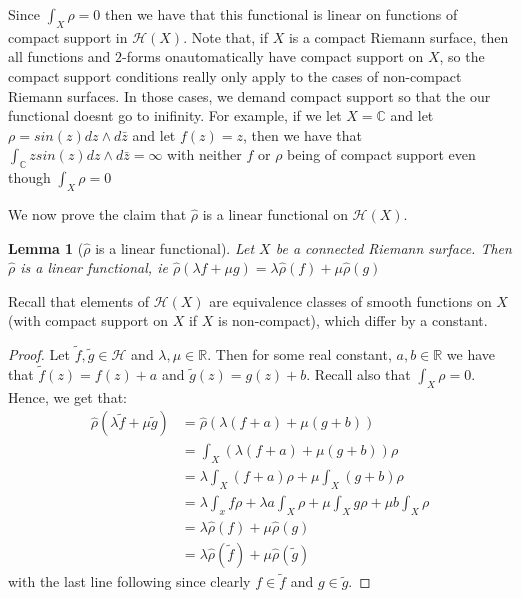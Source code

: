 \documentclass[a4paper,12pt]{report}
\theoremstyle{plain}
\newtheorem{lemma}[thm]{Lemma}
\theoremstyle{definition}
\begin{document}
Since $\int_X \rho = 0$ then we have that this functional is linear on functions of compact support in $\mathcal{H}(X)$. Note that, if $X$ is a compact Riemann surface, then all functions and $2$-forms  onautomatically have compact support on $X$, so the compact support conditions really only apply to the cases of non-compact Riemann surfaces. In those cases, we demand compact support so that the our functional doesnt go to inifinity. For example, if we let $X=\mathbb{C}$ and let $\rho = sin(z)dz\wedge d\bar{z}$ and let $f(z) = z$, then we have that $\int_{\mathbb{C}}zsin(z)dz\wedge d\bar{z} = \infty$ with neither $f$ or $\rho$ being of compact support even though $\int_X \rho = 0$

We now prove the claim that $\hat{\rho}$ is a linear functional on $\mathcal{H}(X)$.
\begin{lemma}[$\hat{\rho}$ is a linear functional]\label{rhohatlinear}
  Let $X$ be a connected Riemann surface. Then $\hat{\rho}$ is a linear functional, ie $\hat{\rho}(\lambda f+ \mu g) = \lambda \hat{\rho}(f) + \mu \hat{\rho}(g)$
\end{lemma}
Recall that elements of $\mathcal{H}(X)$ are equivalence classes of smooth functions on $X$ (with compact support on $X$ if $X$ is non-compact), which differ by a constant.
\begin{proof}
  Let $\tilde{f},\tilde{g} \in \mathcal{H}$ and $\lambda,\mu \in \mathbb{R}$. Then for some real constant, $a,b \in \mathbb{R}$ we have that $\tilde{f}(z) = f(z) + a$ and $\tilde{g}(z) = g(z) + b$. Recall also that $\int_X \rho = 0$.
  Hence, we get that:
  \begin{align*}
    \hat{\rho}(\lambda \tilde{f}+ \mu \tilde{g}) &= \hat{\rho}(\lambda(f + a) + \mu(g + b)) \\
    &=\int_X (\lambda(f + a) + \mu(g + b))\rho \\
    &=\lambda \int_X (f + a)\rho + \mu \int_X (g + b)\rho \\
    &=\lambda \int_x f\rho + \lambda a\int_X \rho + \mu \int_X g\rho + \mu b\int_X \rho \\
    &=\lambda \hat{\rho}(f) + \mu \hat{\rho}(g)\\
    &=\lambda \hat{\rho}(\tilde{f}) + \mu \hat{\rho}(\tilde{g})
  \end{align*}
  with the last line following since clearly $f \in \tilde{f}$ and $g \in \tilde{g}$.
\end{proof}
\end{document}
